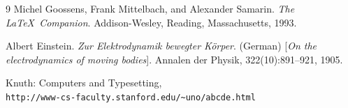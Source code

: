 \documentclass[a4paper,11pt,openright,twoside]{report}      %
\begin{document}
\begin{thebibliography}{9}
Michel Goossens, Frank Mittelbach, and Alexander Samarin. 
\textit{The \LaTeX\ Companion}. 
Addison-Wesley, Reading, Massachusetts, 1993.
 
Albert Einstein. 
\textit{Zur Elektrodynamik bewegter K{\"o}rper}. (German) 
[\textit{On the electrodynamics of moving bodies}]. 
Annalen der Physik, 322(10):891–921, 1905.
 
Knuth: Computers and Typesetting,
\\\texttt{http://www-cs-faculty.stanford.edu/\~{}uno/abcde.html}
\end{thebibliography}
 
 
\end{document}
